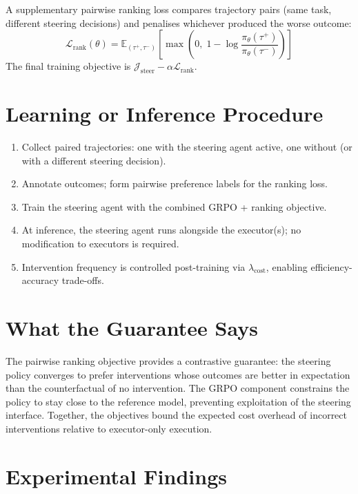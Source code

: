 \documentclass[10pt,twocolumn]{article}
\begin{document}
A supplementary pairwise ranking loss compares trajectory pairs (same task,
different steering decisions) and penalises whichever produced the worse
outcome:
\[
\mathcal{L}_{\text{rank}}(\theta) = \mathbb{E}_{(\tau^+, \tau^-)}\!\left[
  \max\!\left(0,\; 1 - \log\frac{\pi_\theta(\tau^+)}{\pi_\theta(\tau^-)}\right)\right]
\]
The final training objective is $\mathcal{J}_{\text{steer}} - \alpha \mathcal{L}_{\text{rank}}$.

\section{Learning or Inference Procedure}

\begin{enumerate}[itemsep=2pt,parsep=0pt]
  \item Collect paired trajectories: one with the steering agent active,
    one without (or with a different steering decision).
  \item Annotate outcomes; form pairwise preference labels for the ranking
    loss.
  \item Train the steering agent with the combined GRPO + ranking objective.
  \item At inference, the steering agent runs alongside the executor(s);
    no modification to executors is required.
  \item Intervention frequency is controlled post-training via
    $\lambda_{\text{cost}}$, enabling efficiency-accuracy trade-offs.
\end{enumerate}

\section{What the Guarantee Says}

The pairwise ranking objective provides a contrastive guarantee: the steering
policy converges to prefer interventions whose outcomes are better in expectation
than the counterfactual of no intervention. The GRPO component constrains the
policy to stay close to the reference model, preventing exploitation of the
steering interface. Together, the objectives bound the expected cost overhead
of incorrect interventions relative to executor-only execution.

\section{Experimental Findings}
\end{document}
